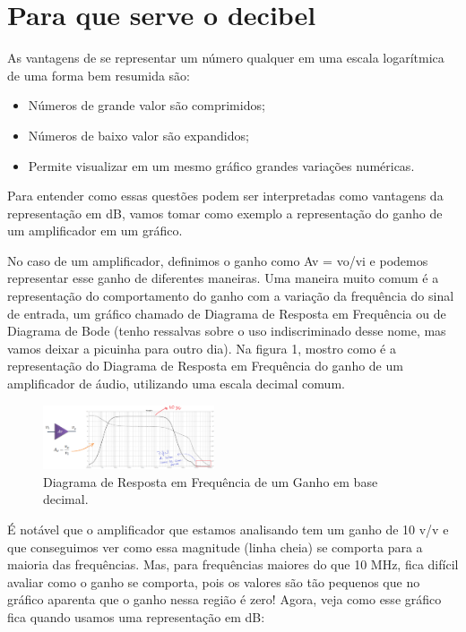 \section{Para que serve o decibel}
As vantagens de se representar um número qualquer em uma escala logarítmica de uma forma bem resumida são:

\begin{itemize}
    \item Números de grande valor são comprimidos;
    \item Números de baixo valor são expandidos;
    \item Permite visualizar em um mesmo gráfico grandes variações numéricas.
\end{itemize}

Para entender como essas questões podem ser interpretadas como vantagens da representação em dB, vamos tomar como exemplo a representação do ganho de um amplificador em um gráfico.

No caso de um amplificador, definimos o ganho como Av = vo/vi e podemos representar esse ganho de diferentes maneiras. Uma maneira muito comum é a representação do comportamento do ganho com a variação da frequência do sinal de entrada, um gráfico chamado de Diagrama de Resposta em Frequência ou de Diagrama de Bode (tenho ressalvas sobre o uso indiscriminado desse nome, mas vamos deixar a picuinha para outro dia). Na figura 1, mostro como é a representação do Diagrama de Resposta em Frequência do ganho de um amplificador de áudio, utilizando uma escala decimal comum.

\begin{figure}[hb]
    \centering
    \includegraphics[width=0.45\textwidth]{imgs/diagramaderesposta.png}
    \caption{Diagrama de Resposta em Frequência de um Ganho em base decimal.}
    \label{fig:cco}
\end{figure}

É notável que o amplificador que estamos analisando tem um ganho de 10 v/v e que conseguimos ver como essa magnitude (linha cheia) se comporta para a maioria das frequências. Mas, para frequências maiores do que 10 MHz, fica difícil avaliar como o ganho se comporta, pois os valores são tão pequenos que no gráfico aparenta que o ganho nessa região é zero! Agora, veja como esse gráfico fica quando usamos uma representação em dB:

